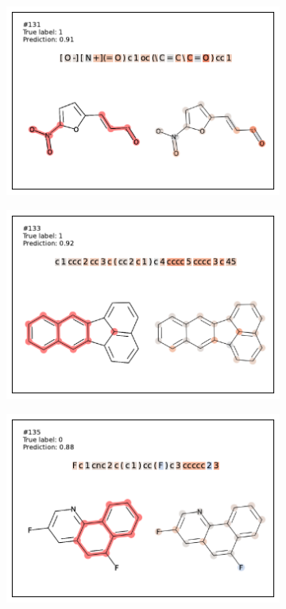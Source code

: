 \begin{figure}
\begin{subfigure}[b]{0.33\textwidth}
\end{subfigure} 
\begin{subfigure}[b]{0.33\textwidth} 
  \centering 
  \includegraphics[width=\textwidth]{figures/ames/ames131.pdf} 
\end{subfigure}\begin{subfigure}[b]{0.33\textwidth} 
  \centering 
  \includegraphics[width=\textwidth]{figures/ames/ames133.pdf} 
\end{subfigure}\begin{subfigure}[b]{0.33\textwidth} 
  \centering 
  \includegraphics[width=\textwidth]{figures/ames/ames135.pdf} 

\end{subfigure}
\end{figure}

